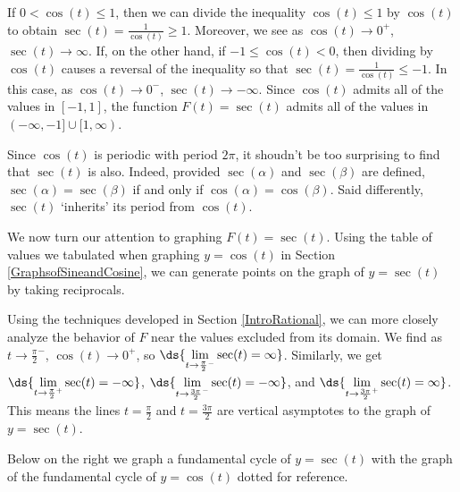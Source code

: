\documentclass{ximera}
\begin{document}
\smallskip

 If $0 < \cos(t) \leq 1$, then we can divide the inequality $\cos(t) \leq 1$ by  $\cos(t)$ to obtain  $\sec(t) = \frac{1}{\cos(t)} \geq 1$.  Moreover, we see as  $\cos(t) \rightarrow 0^{+}$, $\sec(t) \rightarrow \infty$.   If, on the other hand, if $-1 \leq \cos(t) < 0$, then dividing by $\cos(t)$ causes a reversal of the inequality so that $\sec(t) = \frac{1}{\cos(t)} \leq -1$.  In this case, as $\cos(t) \rightarrow 0^{-}$,  $\sec(t) \rightarrow -\infty$.   Since $\cos(t)$ admits all of the values in $[-1,1]$, the function $F(t) = \sec(t)$ admits all of the values in $(-\infty, -1] \cup [1,\infty)$.  

\smallskip

Since $\cos(t)$ is periodic with period $2\pi$, it shoudn't be too surprising to find that $\sec(t)$ is also.  Indeed, provided $\sec(\alpha)$ and  $\sec(\beta)$ are defined, $\sec(\alpha) = \sec(\beta)$ if and only if $\cos(\alpha) = \cos(\beta)$.  Said differently,  $\sec(t)$ `inherits' its period from $\cos(t)$. 

\smallskip

We now turn our attention to graphing $F(t) = \sec(t)$.  Using the table of values we tabulated when graphing $y = \cos(t)$ in Section \ref{GraphsofSineandCosine}, we can generate points on the graph of $y = \sec(t)$ by taking reciprocals.

\smallskip

Using the techniques developed in Section \ref{IntroRational}, we can more closely analyze the behavior of $F$ near the values excluded from its domain.  We find  as $t \rightarrow \frac{\pi}{2}^{-}$, $\cos(t) \rightarrow 0^{+}$, so $\ds{\lim_{t \rightarrow \frac{\pi}{2}^{-}}\sec(t) = \infty}$.  Similarly, we get $\ds{\lim_{t \rightarrow \frac{\pi}{2}^{+}}\sec(t) = -\infty}$, $\ds{\lim_{t \rightarrow \frac{3\pi}{2}^{-}}\sec(t) = -\infty}$, and $\ds{\lim_{t \rightarrow \frac{3\pi}{2}^{+}}\sec(t)  = \infty}$.  This means the lines $t = \frac{\pi}{2}$ and $t = \frac{3\pi}{2}$ are vertical asymptotes to the graph of $y = \sec(t)$.


\smallskip

Below on the right we graph a fundamental cycle of $y = \sec(t)$  with the graph of the fundamental cycle of $y = \cos(t)$ dotted for reference.  

\smallskip
\end{document}
